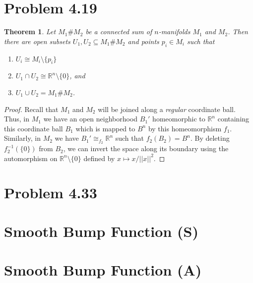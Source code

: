 \documentclass{article}
\newtheorem{theorem}[subsection]{Theorem}
\theoremstyle{definition}
\newcommand{\R}{\mathbb{R}}
\newcommand{\norm}[1]{\left|\left|#1\right|\right|}
\begin{document}
\section{Problem 4.19}
\begin{theorem}
Let $M_1 \# M_2$ be a connected sum of $n$-manifolds $M_1$ and $M_2$. Then
there are open subsets $U_1, U_2 \subseteq M_1 \# M_2$ and points $p_i \in 
M_i$ such that 
\begin{enumerate}
\item $U_i \cong M_i \setminus \{p_i\}$
\item $U_1 \cap U_2 \cong \R^n \setminus \{0\}$, and
\item $U_1 \cup U_2 = M_1 \# M_2$.
\end{enumerate}
\end{theorem}
\begin{proof}
Recall that $M_1$ and $M_2$ will be joined along a \textit{regular}
coordinate ball. Thus, in $M_1$ we have an open neighborhood $B_1'$ homeomorphic 
to $\R^n$ containing this coordinate ball $B_1$ which is mapped to $B^n$ by this 
homeomorphism $f_1$. Similarly, in $M_2$ we have $B_1' \cong_{f_2} \R^n$ such 
that $f_2(B_2) = B^n$. By deleting $f_2^{-1}(\{0\})$ from $B_2$, we can invert the 
space along its boundary using the automorphism on $\R^n \setminus \{0\}$ defined
by $x \mapsto x/\norm{x}^2$. 
\end{proof}
\section{Problem 4.33}
\section{Smooth Bump Function (S)}
\section{Smooth Bump Function (A)}
\end{document}

